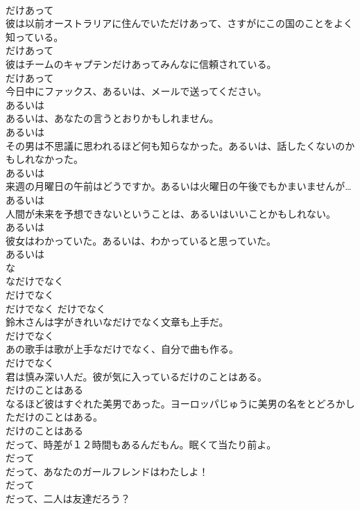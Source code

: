 \documentclass[8pt]{extreport}
\begin{document}
\begin{CJK}{UTF8}{min}
\\	だけあって	
\\	彼は以前オーストラリアに住んでいただけあって、さすがにこの国のことをよく知っている。	
\\	だけあって	
\\	彼はチームのキャプテンだけあってみんなに信頼されている。	
\\	だけあって	
\\	今日中にファックス、あるいは、メールで送ってください。	
\\	あるいは	
\\	あるいは、あなたの言うとおりかもしれません。	
\\	あるいは	
\\	その男は不思議に思われるほど何も知らなかった。あるいは、話したくないのかもしれなかった。	
\\	あるいは	
\\	来週の月曜日の午前はどうですか。あるいは火曜日の午後でもかまいませんが…	
\\	あるいは	
\\	人間が未来を予想できないということは、あるいはいいことかもしれない。	
\\	あるいは	
\\	彼女はわかっていた。あるいは、わかっていると思っていた。	
\\	あるいは	
\\	な
\\	なだけでなく	
\\	だけでなく	
\\	だけでなく	だけでなく	
\\	鈴木さんは字がきれいなだけでなく文章も上手だ。	
\\	だけでなく	
\\	あの歌手は歌が上手なだけでなく、自分で曲も作る。	
\\	だけでなく	
\\	君は慎み深い人だ。彼が気に入っているだけのことはある。	
\\	だけのことはある	
\\	なるほど彼はすぐれた美男であった。ヨーロッパじゅうに美男の名をとどろかしただけのことはある。	
\\	だけのことはある	
\\	だって、時差が１２時間もあるんだもん。眠くて当たり前よ。	
\\	だって	
\\	だって、あなたのガールフレンドはわたしよ！	
\\	だって	
\\	だって、二人は友達だろう？	

\end{CJK}
\end{document}
